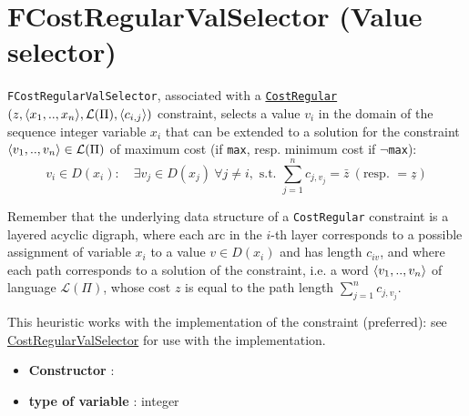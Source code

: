 \section{FCostRegularValSelector (Value selector)}\label{fcostregularvalselector:fcostregularvalselectorvalselector}\hypertarget{fcostregularvalselector:fcostregularvalselectorvalselector}{}
\begin{notedef}
  \texttt{FCostRegularValSelector}, associated with a \hyperlink{costregular:costregularconstraint}{\texttt{CostRegular}}$(z, \langle x_1,..,x_n\rangle,\mathcal{L}(\Pi), \langle c_{i,j}\rangle)$ constraint, selects a value $v_i$ in the domain of the sequence integer variable $x_i$ that can be extended to a solution for the constraint $\langle v_1,..,v_n\rangle\in\mathcal{L}(\Pi)$ of maximum cost (if \texttt{max}, resp. minimum cost if $\neg$\texttt{max}):
$$ v_i\in D(x_i):\quad \exists v_j\in D(x_j)\ \forall j\neq i, \text{ s.t. } \sum_{j=1}^n c_{j,v_j} = \bar{z}\ (\text{resp. } =\underline{z})$$   
\end{notedef}
Remember that the underlying data structure of a \texttt{CostRegular} constraint is a layered acyclic digraph, where each arc in the $i$-th layer corresponds to a possible assignment of variable $x_i$ to a value $v\in D(x_i)$ and has length $c_{iv}$, and where each path corresponds to a solution of the constraint, i.e. a word $\langle v_1,..,v_n\rangle$ of language $\mathcal{L}(\Pi)$, whose cost $z$ is equal to the path length $\sum_{j=1}^n c_{j,v_j}$.

This heuristic works with the  implementation of the constraint (preferred): see \hyperlink{costregularvalselector:costregularvalselectorvalselector}{CostRegularValSelector} for use with the  implementation.

\begin{itemize}
	\item \textbf{Constructor} : 
	\item \textbf{type of variable} : integer
\end{itemize}

%


